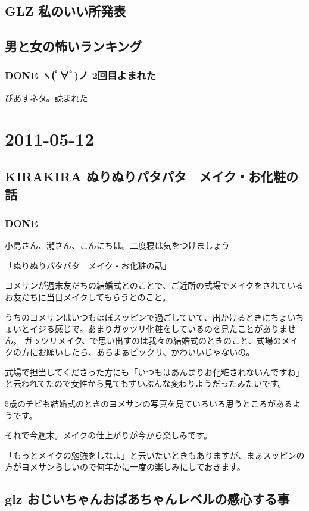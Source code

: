 \documentclass[11pt]{article}
\begin{document}
\subsection{GLZ 私のいい所発表}
\label{sec-123_2}
\subsection{男と女の怖いランキング}
\label{sec-123_3}
\subsubsection{\textbf{DONE} ヽ(ﾟ∀ﾟ)ノ 2回目よまれた}
\label{sec-123_3_1}

ぴあすネタ。読まれた
\section{2011-05-12}
\label{sec-124}
\subsection{KIRAKIRA ぬりぬりパタパタ　メイク・お化粧の話}
\label{sec-124_1}
\subsubsection{\textbf{DONE}}
\label{sec-124_1_1}

小島さん、瀧さん、こんにちは。二度寝は気をつけましょう

「ぬりぬりパタパタ　メイク・お化粧の話」

ヨメサンが週末友だちの結婚式とのことで、ご近所の式場でメイクをされているお友だちに当日メイクしてもらうとのこと。

うちのヨメサンはいつもほぼスッピンで過ごしていて、出かけるときにちょいちょいとイジる感じで。あまりガッツリ化粧をしているのを見たことがありません。
ガッツリメイク、で思い出すのは我々の結婚式のときのこと、式場のメイクの方にお願いしたら、あらまぁビックリ、かわいいじゃないの。

式場で担当してくださった方にも「いつもはあんまりお化粧されないんですね」と云われてたので女性から見てもずいぶんな変わりようだったみたいです。

5歳のチビも結婚式のときのヨメサンの写真を見ていろいろ思うところがあるようです。

それで今週末。メイクの仕上がりが今から楽しみです。

「もっとメイクの勉強をしなよ」と云いたいときもありますが、まぁスッピンの方がヨメサンらしいので何年かに一度の楽しみにしておきます。
\subsection{glz おじいちゃんおばあちゃんレベルの感心する事}
\label{sec-124_2}
\end{document}
